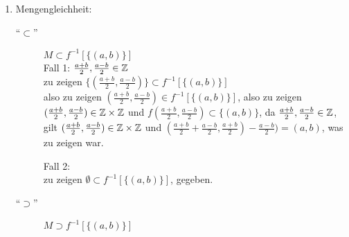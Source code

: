 \documentclass{gadsescript}
\begin{document}
\begin{enumerate}[label=(\alph*)]
\begin{proof*}[(i) - (iv)]
\begin{enumerate}[label=(\roman*)]
					Es gilt
					\begin{align*}
						f(x_1, y_1) &= f(x_2, y_2)\\
						( x_1 + y_1, x_1 - y_1) &= ( x_2 + y_2, x_2 - y_2)
					\end{align*}
					also
					\begin{align*}
						x_1 - y_1 &= x_2 - y_2\\
						x_1 - x_2 &= y_1 - y_2
					\end{align*}
					und
					\begin{align*}
						x_1 + y_1 &= x_2 + y_2\\
						\underbrace{x_1 - x_2}_{y_1 - y_2} &= y_2 - y_1\\
						y_1 - y_2 &= y_2 - y_1\\
						2y_1 &= 2y_2\\
						y_1 &= y_2
					\end{align*}
					Außerdem
					\begin{align*}
						x_1 + \underbrace{y_1}_{y_2} &= x_2 + y_2\\
						x_1 + y_2 &= x_2 + y_2\\
						x_1 &= x_2
					\end{align*}
					Also gilt $ x_1 = x_2 $ und $ y_1 = y_2 $ und somit $ (x_1, y_1) = (x_2, y_2) $\qed
				\item Mengengleichheit: 
					\begin{description}
						\item[``$\subset$''] $M \subset f^{-1}[\{(a, b)\}]$\\
							Fall 1: $\frac{a + b}{2}, \frac{a - b}{2} \in \mathbb{Z} $\\
							zu zeigen $ \{ (\frac{a+b}{2}, \frac{a-b}{2}) \} \subset f^{-1}[\{(a, b)\}]$\\
							also zu zeigen $ (\frac{a+b}{2}, \frac{a-b}{2}) \in f^{-1}[\{(a, b)\}]$,
							also zu zeigen $(\frac{a+b}{2}, \frac{a-b}{2}) \in \mathbb{Z}\times\mathbb{Z} $ und $ f(\frac{a+b}{2}, \frac{a-b}{2}) \subset \{ (a, b) \} $,
							da $\frac{a + b}{2}, \frac{a - b}{2} \in \mathbb{Z} $, gilt $ (\frac{a+b}{2}, \frac{a-b}{2}) \in \mathbb{Z}\times\mathbb{Z} $ und $ (\frac{a+b}{2} + \frac{a-b}{2}, \frac{a+b}{2}) - \frac{a-b}{2} ) = (a,b) $, was zu zeigen war.\\\par
							Fall 2:\\
							zu zeigen $ \emptyset \subset f^{-1}[\{(a, b)\}] $, gegeben.
						\item[``$\supset$''] $M \supset f^{-1}[\{(a, b)\}]$\\

\end{description}
\end{enumerate}
\end{proof*}
\end{enumerate}
\end{document}
